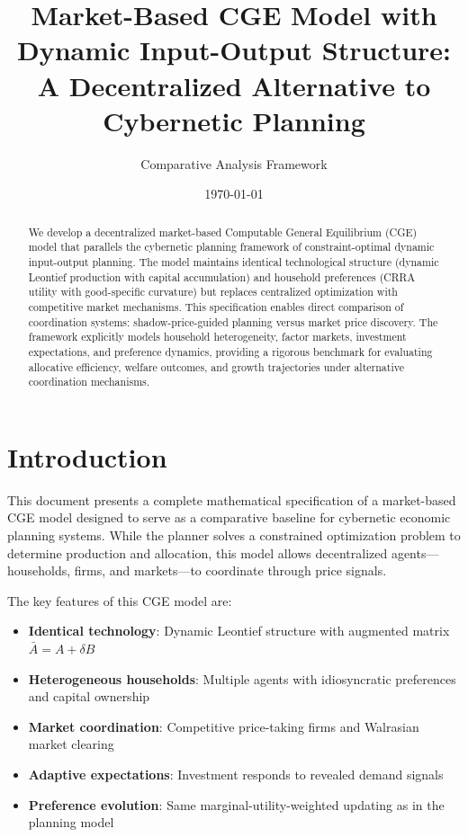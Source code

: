 \documentclass[12pt,a4paper]{article}
\title{Market-Based CGE Model with Dynamic Input-Output Structure:\\A Decentralized Alternative to Cybernetic Planning}
\author{Comparative Analysis Framework}
\date{\today}
\theoremstyle{definition}
\theoremstyle{remark}
\begin{document}
\maketitle

\begin{abstract}
We develop a decentralized market-based Computable General Equilibrium (CGE) model that parallels the cybernetic planning framework of constraint-optimal dynamic input-output planning. The model maintains identical technological structure (dynamic Leontief production with capital accumulation) and household preferences (CRRA utility with good-specific curvature) but replaces centralized optimization with competitive market mechanisms. This specification enables direct comparison of coordination systems: shadow-price-guided planning versus market price discovery. The framework explicitly models household heterogeneity, factor markets, investment expectations, and preference dynamics, providing a rigorous benchmark for evaluating allocative efficiency, welfare outcomes, and growth trajectories under alternative coordination mechanisms.
\end{abstract}

\tableofcontents
\newpage

\section{Introduction}

This document presents a complete mathematical specification of a market-based CGE model designed to serve as a comparative baseline for cybernetic economic planning systems. While the planner solves a constrained optimization problem to determine production and allocation, this model allows decentralized agents—households, firms, and markets—to coordinate through price signals.

The key features of this CGE model are:
\begin{itemize}
    \item \textbf{Identical technology}: Dynamic Leontief structure with augmented matrix $\bar{A} = A + \delta B$
    \item \textbf{Heterogeneous households}: Multiple agents with idiosyncratic preferences and capital ownership
    \item \textbf{Market coordination}: Competitive price-taking firms and Walrasian market clearing
    \item \textbf{Adaptive expectations}: Investment responds to revealed demand signals
    \item \textbf{Preference evolution}: Same marginal-utility-weighted updating as in the planning model
\end{itemize}
\end{document}
